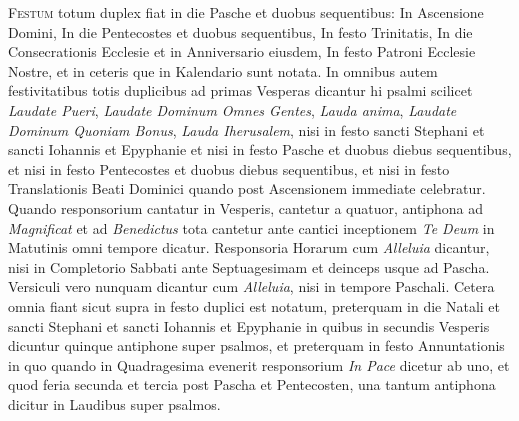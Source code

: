 \begin{multicols*}{2}
{\color{Red} }
\lettrine[lines=2]{\zallmancaps \color{Blue} F}{estum} totum duplex fiat in die Pasche et duobus sequentibus: In Ascensione Domini, In die Pentecostes et duobus sequentibus, In festo Trinitatis, In die Consecrationis Ecclesie et in Anniversario eiusdem, In festo Patroni Ecclesie Nostre, et in ceteris que in Kalendario sunt notata.
In omnibus autem festivitatibus totis duplicibus ad primas Vesperas dicantur hi psalmi scilicet \textit{Laudate Pueri}, \textit{Laudate Dominum Omnes Gentes}, \textit{Lauda anima}, \textit{Laudate Dominum Quoniam Bonus}, \textit{Lauda Iherusalem}, nisi in festo sancti Stephani et sancti Iohannis et Epyphanie et nisi in festo Pasche et duobus diebus sequentibus, et nisi in festo Pentecostes et duobus diebus sequentibus, et nisi in festo Translationis Beati Dominici quando post Ascensionem immediate celebratur. Quando responsorium cantatur in Vesperis, cantetur a quatuor, antiphona ad \textit{Magnificat} et ad \textit{Benedictus} tota cantetur ante cantici inceptionem \textit{Te Deum} in Matutinis omni tempore dicatur. Responsoria Horarum cum \textit{Alleluia} dicantur, nisi in Completorio Sabbati ante Septuagesimam et deinceps usque ad Pascha. Versiculi vero nunquam dicantur cum \textit{Alleluia}, nisi in tempore Paschali.
Cetera omnia fiant sicut supra in festo duplici est notatum, preterquam in die Natali et sancti Stephani et sancti Iohannis et Epyphanie in quibus in secundis Vesperis dicuntur quinque antiphone super psalmos, et preterquam in festo Annuntationis in quo quando in Quadragesima evenerit responsorium \textit{In Pace} dicetur ab uno, et quod feria secunda et tercia post Pascha et Pentecosten, una tantum antiphona dicitur in Laudibus super psalmos.




\end{multicols*}
